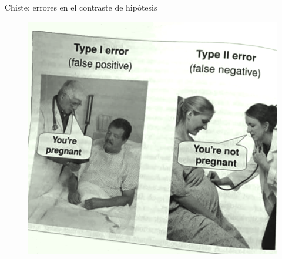 \begin{myexampleblock}{Chiste: errores en el contraste de hipótesis}
\begin{figure}[H]
	\centering
	\includegraphics[width=1\textwidth]{imagenes/imagenes06/T06IM04.png}
	\end{figure}	
\end{myexampleblock}

\newpage

$\quad$

$\quad$


